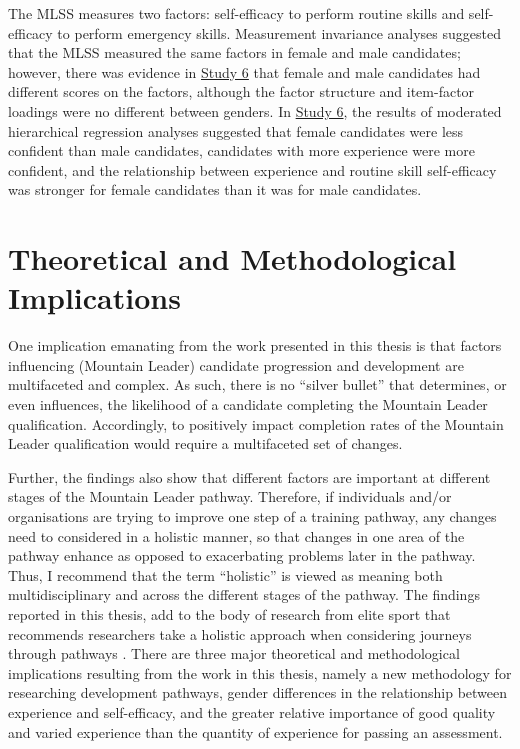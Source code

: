 \documentclass[
  12pt,
  a4paper,
]{book}
\begin{document}
The MLSS measures two factors: self-efficacy to perform routine skills and self-efficacy to perform emergency skills. Measurement invariance analyses suggested that the MLSS measured the same factors in female and male candidates; however, there was evidence in \href{study-6}{Study 6} that female and male candidates had different scores on the factors, although the factor structure and item-factor loadings were no different between genders. In \href{study-6}{Study 6}, the results of moderated hierarchical regression analyses suggested that female candidates were less confident than male candidates, candidates with more experience were more confident, and the relationship between experience and routine skill self-efficacy was stronger for female candidates than it was for male candidates.

\hypertarget{theoretical-and-methodological-implications}{%
\section{Theoretical and Methodological Implications}\label{theoretical-and-methodological-implications}}

One implication emanating from the work presented in this thesis is that factors influencing (Mountain Leader) candidate progression and development are multifaceted and complex. As such, there is no ``silver bullet'' that determines, or even influences, the likelihood of a candidate completing the Mountain Leader qualification. Accordingly, to positively impact completion rates of the Mountain Leader qualification would require a multifaceted set of changes.

Further, the findings also show that different factors are important at different stages of the Mountain Leader pathway. Therefore, if individuals and/or organisations are trying to improve one step of a training pathway, any changes need to considered in a holistic manner, so that changes in one area of the pathway enhance as opposed to exacerbating problems later in the pathway. Thus, I recommend that the term ``holistic'' is viewed as meaning both multidisciplinary and across the different stages of the pathway. The findings reported in this thesis, add to the body of research from elite sport that recommends researchers take a holistic approach when considering journeys through pathways \citep[e.g.,][]{Jones2019a, Gullich2019, Hardy2017}. There are three major theoretical and methodological implications resulting from the work in this thesis, namely a new methodology for researching development pathways, gender differences in the relationship between experience and self-efficacy, and the greater relative importance of good quality and varied experience than the quantity of experience for passing an assessment.
\end{document}
